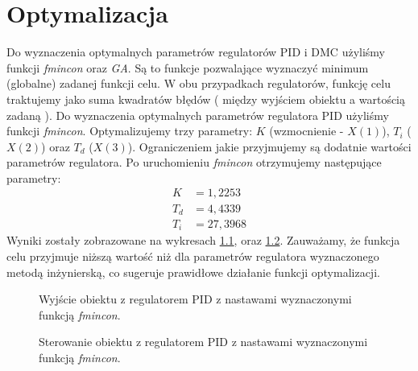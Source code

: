 \chapter{Optymalizacja}
Do wyznaczenia optymalnych parametrów regulatorów PID i DMC użyliśmy funkcji \emph{fmincon} oraz \emph{GA}. Są to funkcje pozwalające wyznaczyć minimum (globalne) zadanej funkcji celu.
W obu przypadkach regulatorów, funkcję celu traktujemy jako suma kwadratów błędów ( między wyjściem obiektu a wartością zadaną ).
Do wyznaczenia optymalnych parametrów regulatora PID użyliśmy funkcji \emph{fmincon}. Optymalizujemy trzy parametry: $K$ (wzmocnienie - $X(1)$), $T_i$ ($X(2)$) oraz $T_d$ ($X(3)$).
Ograniczeniem jakie przyjmujemy są dodatnie wartości parametrów regulatora. Po uruchomieniu \emph{fmincon} otrzymujemy następujące parametry:
\begin{align}
  K &= 1,2253 \nonumber \\
  T_d &= 4,4339 \\
  T_i &= 27,3968 \nonumber
\end{align}
Wyniki zostały zobrazowane na wykresach \ref{fig:optim_pid_out}, oraz \ref{fig:optim_pid_ster}.
Zauważamy, że funkcja celu przyjmuje niższą wartość niż dla parametrów regulatora wyznaczonego metodą inżynierską, co sugeruje prawidłowe działanie funkcji optymalizacji.

\begin{figure}[tb]
\centering
{}
\caption{Wyjście obiektu z regulatorem PID z nastawami wyznaczonymi funkcją \emph{fmincon}.}
\label{fig:optim_pid_out}
\end{figure}

\begin{figure}[tb]
\centering
{}
\caption{Sterowanie obiektu z regulatorem PID z nastawami wyznaczonymi funkcją \emph{fmincon}.}
\label{fig:optim_pid_ster}
\end{figure}

